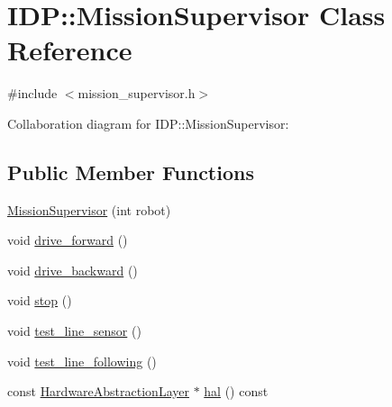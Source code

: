 \hypertarget{classIDP_1_1MissionSupervisor}{
\section{IDP::MissionSupervisor Class Reference}
\label{classIDP_1_1MissionSupervisor}
}


{\ttfamily \#include $<$mission\_\-supervisor.h$>$}



Collaboration diagram for IDP::MissionSupervisor:
\subsection*{Public Member Functions}
\begin{DoxyCompactItemize}
\item 
\hyperlink{classIDP_1_1MissionSupervisor_afc6a54e04718d919b2b48458a47304b2}{MissionSupervisor} (int robot)
\item 
void \hyperlink{classIDP_1_1MissionSupervisor_af8c6a3073190a4479211753fe5f50a36}{drive\_\-forward} ()
\item 
void \hyperlink{classIDP_1_1MissionSupervisor_ae5d6e9a37417126da780583349b48d44}{drive\_\-backward} ()
\item 
void \hyperlink{classIDP_1_1MissionSupervisor_ad11e444b6be1d51c3339bd6397d45fd4}{stop} ()
\item 
void \hyperlink{classIDP_1_1MissionSupervisor_af147b0bec9464bb7e956a40a7f3d0fda}{test\_\-line\_\-sensor} ()
\item 
void \hyperlink{classIDP_1_1MissionSupervisor_a21be0b52e2f13c7fb373c90dae77ba23}{test\_\-line\_\-following} ()
\item 
const \hyperlink{classIDP_1_1HardwareAbstractionLayer}{HardwareAbstractionLayer} $\ast$ \hyperlink{classIDP_1_1MissionSupervisor_ae19d0c2123fda158cc45e649128fbc09}{hal} () const 
\end{DoxyCompactItemize}


